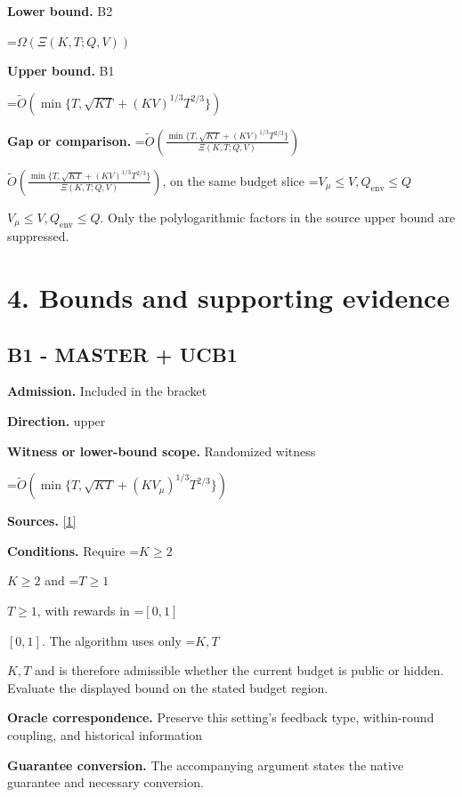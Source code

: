 \documentclass[10pt,a4paper]{article}
\newcommand{\AtlasMath}[1]{\par\begingroup\centering\setbox0=\hbox{$\displaystyle #1$}\ifdim\wd0>1.4\linewidth\typeout{ATLAS WIDE FORMULA: \the\wd0}\fi\ifdim\wd0>\linewidth\resizebox{\linewidth}{!}{\box0}\else\box0\fi\par\endgroup}
\newcommand{\AtlasInlineMath}[1]{\begingroup\setbox0=\hbox{$#1$}\ifdim\wd0>.4\linewidth\endgroup\AtlasMath{#1}\else\endgroup$#1$\fi}
\begin{document}
\textbf{Lower bound.} B2



\AtlasMath{\Omega(\Xi(K,T;Q,V))}


\textbf{Upper bound.} B1



\AtlasMath{\widetilde{O}(\min\{T,\sqrt{KT}+(KV)^{1/3}T^{2/3}\})}


\textbf{Gap or comparison.} \AtlasInlineMath{\widetilde O\!\left(\frac{\min\{T,\sqrt{KT}+(KV)^{1/3}T^{2/3}\}}{\Xi(K,T;Q,V)}\right)}, on the same budget slice \AtlasInlineMath{V_\mu\le V, Q_{\mathrm{env}}\le Q}. Only the polylogarithmic factors in the source upper bound are suppressed.



\section{4. Bounds and supporting evidence}


\subsection{B1 - MASTER + UCB1}


\textbf{Admission.} Included in the bracket



\textbf{Direction.} upper



\textbf{Witness or lower-bound scope.} Randomized witness



\AtlasMath{\widetilde{O}\!\left(\min\{T,\sqrt{KT}+(KV_\mu)^{1/3}T^{2/3}\}\right)}


\textbf{Sources.} \href{https://proceedings.mlr.press/v134/wei21b.html}{[1]}



\textbf{Conditions.} Require \AtlasInlineMath{K\ge2} and \AtlasInlineMath{T\ge1}, with rewards in \AtlasInlineMath{[0,1]}. The algorithm uses only \AtlasInlineMath{K,T} and is therefore admissible whether the current budget is public or hidden. Evaluate the displayed bound on the stated budget region.



\textbf{Oracle correspondence.} Preserve this setting's feedback type, within-round coupling, and historical information



\textbf{Guarantee conversion.} The accompanying argument states the native guarantee and necessary conversion.
\end{document}
